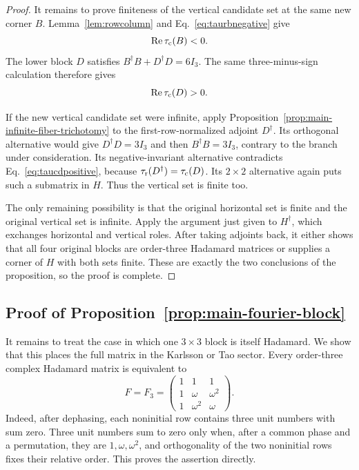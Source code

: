 \documentclass[aps,prx,reprint,nofootinbib,twoside,superscriptaddress,longbibliography,floatfix]{revtex4-2}
\theoremstyle{definition}
\newcommand{\RePart}{\operatorname{Re}}
\begin{document}
\begin{proof}
It remains to prove finiteness of the vertical candidate set at the same new corner $B$.  Lemma~\ref{lem:rowcolumn} and Eq.~\eqref{eq:taurbnegative} give
\begin{equation}
\RePart\tau_{\rm c}(B)<0.
\label{eq:taucbnegative}
\end{equation}
The lower block $D$ satisfies $B^{\dagger}B+D^{\dagger}D=6I_3$.  The same three-minus-sign calculation therefore gives
\begin{equation}
\RePart\tau_{\rm c}(D)>0.
\label{eq:taucdpositive}
\end{equation}

If the new vertical candidate set were infinite, apply Proposition~\ref{prop:main-infinite-fiber-trichotomy} to the first-row-normalized adjoint $D^{\dagger}$. Its orthogonal alternative would give $D^{\dagger}D=3I_3$ and then $B^{\dagger}B=3I_3$, contrary to the branch under consideration.  Its negative-invariant alternative contradicts Eq.~\eqref{eq:taucdpositive}, because $\tau_{\rm r}(D^{\dagger})=\tau_{\rm c}(D)$.  Its $2\times2$ alternative again puts such a submatrix in $H$.  Thus the vertical set is finite too.

The only remaining possibility is that the original horizontal set is finite and the original vertical set is infinite.  Apply the argument just given to $H^{\dagger}$, which exchanges horizontal and vertical roles.  After taking adjoints back, it either shows that all four original blocks are order-three Hadamard matrices or supplies a corner of $H$ with both sets finite. These are exactly the two conclusions of the proposition, so the proof is complete.
\end{proof}

\subsection{{Proof of Proposition~\ref{prop:main-fourier-block}}}
\label{sec:fourierblock}

It remains to treat the case in which one $3\times3$ block is itself Hadamard. We show that this places the full matrix in the Karlsson or Tao sector.
%
Every order-three complex Hadamard matrix is equivalent to
\begin{equation}
F=F_3=\begin{pmatrix}
1&1&1\\
1&\omega&\omega^2\\
1&\omega^2&\omega
\end{pmatrix}.
\label{eq:F3}
\end{equation}
Indeed, after dephasing, each noninitial row contains three unit numbers with sum zero.  Three unit numbers sum to zero only when, after a common phase and a permutation, they are $1,\omega,\omega^2$, and orthogonality of the two noninitial rows fixes their relative order. This proves the assertion directly.
\end{document}
